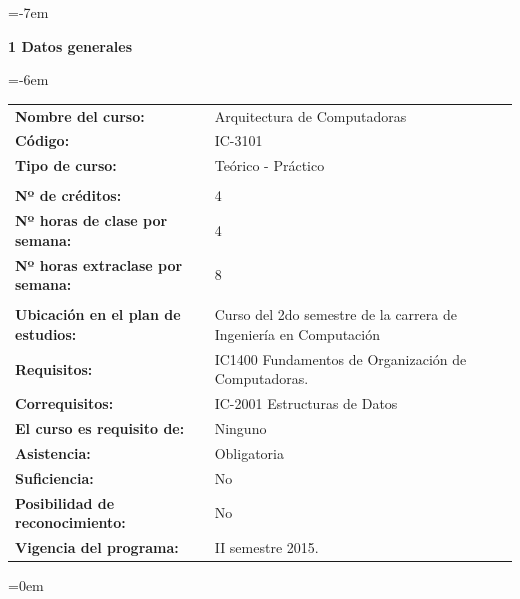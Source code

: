 \documentclass[11pt,fleqn]{report}
\begin{document}
\parindent=-7em

\textcolor{tec}{
  {\large \textbf{1 Datos generales}}}

\parindent=-6em

\doublespacing
  \begin{tabularx}{\textwidth}{p{6cm}p{10cm}}
        \textbf{Nombre del curso:}                  & Arquitectura de Computadoras         \\
        \textbf{Código:}                            & IC-3101         \\
        \textbf{Tipo de curso:}                     & Teórico - Práctico           \\
                                                    &                       \\
        \textbf{Nº de créditos:}                    & 4            \\
        \textbf{Nº horas de clase por semana:}      & 4          \\
        \textbf{Nº horas extraclase por semana:}    & 8     \\
                                                    &                       \\
        \textbf{Ubicación en el plan de estudios:}  & Curso del 2do semestre de la carrera de Ingeniería en Computación       \\
        \textbf{Requisitos:}                        & IC1400 Fundamentos de Organización de Computadoras.          \\
        \textbf{Correquisitos:}                     & IC-2001 Estructuras de Datos       \\ 
        \textbf{El curso es requisito de:}          & Ninguno         \\
        \textbf{Asistencia:}                        & Obligatoria          \\
        \textbf{Suficiencia:}                       & No         \\ 
        \textbf{Posibilidad de reconocimiento:}     & No      \\
        \textbf{Vigencia del programa:}             & II semestre 2015.            \\
    \end{tabularx}
\singlespacing


\parindent=0em

\end{document}

